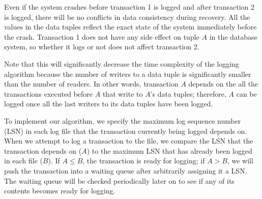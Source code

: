 Even if the system crashes before transaction 1 is logged and after transaction 2 is logged, there will be no conflicts in data consistency during recovery. All the values in the data tuples reflect the exact state of the system immediately before the crash. Transaction 1 does not have any side effect on tuple $A$ in the database system, so whether it logs or not does not affect transaction 2.\par

Note that this will significantly decrease the time complexity of the logging algorithm because the number of writers to a data tuple is significantly smaller than the number of readers. In other words, transaction $A$ depends on the all the transactions executed before $A$ that write to $A$'s data tuples; therefore, $A$ can be logged once all the last writers to its data tuples have been logged. \par

To implement our algorithm, we specify the maximum log sequence number (LSN) in each log file that the transaction currently being logged depends on. When we attempt to log a transaction to the file, we compare the LSN that the transaction depends on ($A$) to the maximum LSN that has already been logged in each file ($B$). If $A\leq B$, the transaction is ready for logging; if $A>B$, we will push the transaction into a waiting queue after arbitrarily assigning it a LSN. The waiting queue will be checked periodically later on to see if any of its contents becomes ready for logging.\par


